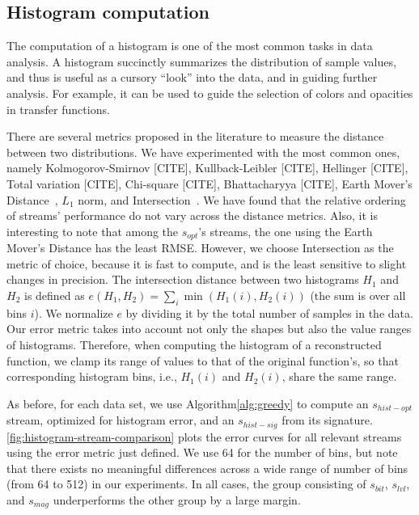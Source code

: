 \subsection{Histogram computation}\label{sec:histogram}


The computation of a histogram is one of the most common tasks in data analysis. A histogram
succinctly summarizes the distribution of sample values, and thus is useful as a cursory ``look''
into the data, and in guiding further analysis. For example, it can be used to guide the selection
of colors and opacities in transfer functions.

There are several metrics proposed in the literature to measure the distance between two
distributions. We have experimented with the most common ones, namely Kolmogorov-Smirnov [CITE],
Kullback-Leibler [CITE], Hellinger [CITE], Total variation [CITE], Chi-square [CITE], Bhattacharyya
[CITE], Earth Mover's Distance~\cite{emd1998}, $L_1$ norm, and
Intersection~\cite{histogram_intersection1991}. We have found that the relative ordering of streams'
performance do not vary across the distance metrics. Also, it is interesting to note that among the
$s_{opt}$'s streams, the one using the Earth Mover's Distance has the least RMSE. However, we choose
Intersection as the metric of choice, because it is fast to compute, and is the least sensitive to
slight changes in precision. The intersection distance between two histograms $H_1$ and $H_2$ is
defined as $e(H_1,H_2)=\sum_{i}{\min{(H_1(i),H_2(i))}}$ (the sum is over all bins $i$). We normalize
$e$ by dividing it by the total number of samples in the data. Our error metric takes into account
not only the shapes but also the value ranges of histograms. Therefore, when computing the histogram
of a reconstructed function, we clamp its range of values to that of the original function's, so
that corresponding histogram bins, i.e., $H_1(i)$ and $H_2(i)$, share the same range.

As before, for each data set, we use Algorithm\autoref{alg:greedy} to compute an $s_{hist-opt}$
stream, optimized for histogram error, and an $s_{hist-sig}$ from its signature.
\autoref{fig:histogram-stream-comparison} plots the error curves for all relevant streams using the
error metric just defined. We use 64 for the number of bins, but note that there exists no
meaningful differences across a wide range of number of bins (from 64 to 512) in our experiments. In
all cases, the group consisting of $s_{bit}$, $s_{lvl}$, and $s_{mag}$ underperforms the other group
by a large margin.


